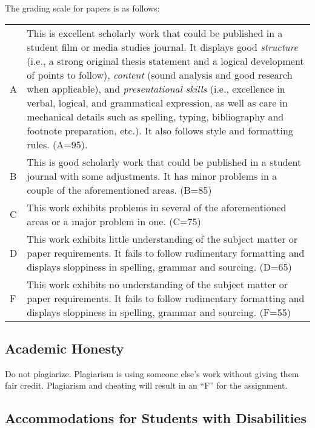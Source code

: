 \documentclass[
  letterpaper,
  DIV=11,
  numbers=noendperiod]{scrartcl}
\begin{document}
The grading scale for papers is as follows:

\begin{longtable}[]{@{}
  >{\raggedright\arraybackslash}p{}
  >{\raggedright\arraybackslash}p{}@{}}
\toprule\noalign{}
\endhead
\bottomrule\noalign{}
\endlastfoot
A & This is excellent scholarly work that could be published in a
student film or media studies journal. It displays good \emph{structure}
(i.e., a strong original thesis statement and a logical development of
points to follow), \emph{content} (sound analysis and good research when
applicable), and \emph{presentational skills} (i.e., excellence in
verbal, logical, and grammatical expression, as well as care in
mechanical details such as spelling, typing, bibliography and footnote
preparation, etc.). It also follows style and formatting rules.
(A=95). \\
B & This is good scholarly work that could be published in a student
journal with some adjustments. It has minor problems in a couple of the
aforementioned areas. (B=85) \\
C & This work exhibits problems in several of the aforementioned areas
or a major problem in one. (C=75) \\
D & This work exhibits little understanding of the subject matter or
paper requirements. It fails to follow rudimentary formatting and
displays sloppiness in spelling, grammar and sourcing. (D=65) \\
F & This work exhibits no understanding of the subject matter or paper
requirements. It fails to follow rudimentary formatting and displays
sloppiness in spelling, grammar and sourcing. (F=55) \\
\end{longtable}

\subsection{Academic Honesty}\label{academic-honesty}

Do not plagiarize. Plagiarism is using someone else's work without
giving them fair credit. Plagiarism and cheating will result in an ``F''
for the assignment.

\subsection{Accommodations for Students with
Disabilities}\label{accommodations-for-students-with-disabilities}
\end{document}
